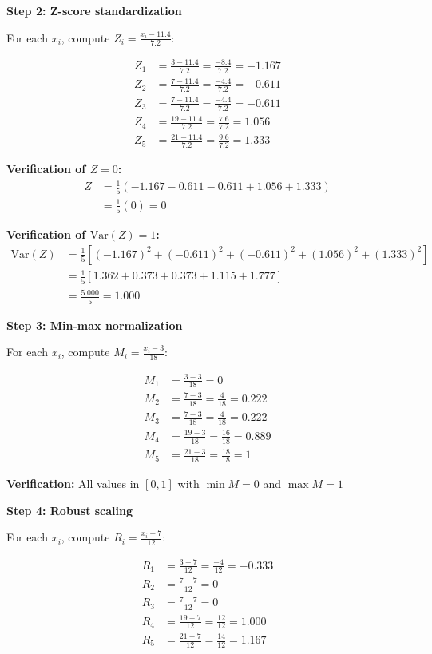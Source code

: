 \documentclass[12pt]{article}
\begin{document}
\begin{solution}
\textbf{Step 2: Z-score standardization}

For each \(x_i\), compute \(Z_i = \frac{x_i - 11.4}{7.2}\):

\begin{align*}
Z_1 &= \frac{3 - 11.4}{7.2} = \frac{-8.4}{7.2} = -1.167 \\
Z_2 &= \frac{7 - 11.4}{7.2} = \frac{-4.4}{7.2} = -0.611 \\
Z_3 &= \frac{7 - 11.4}{7.2} = \frac{-4.4}{7.2} = -0.611 \\
Z_4 &= \frac{19 - 11.4}{7.2} = \frac{7.6}{7.2} = 1.056 \\
Z_5 &= \frac{21 - 11.4}{7.2} = \frac{9.6}{7.2} = 1.333
\end{align*}

\textbf{Verification of \(\bar{Z} = 0\):}
\begin{align*}
\bar{Z} &= \frac{1}{5}(-1.167 - 0.611 - 0.611 + 1.056 + 1.333) \\
&= \frac{1}{5}(0) = 0
\end{align*}

\textbf{Verification of \(\text{Var}(Z) = 1\):}
\begin{align*}
\text{Var}(Z) &= \frac{1}{5}\left[(-1.167)^2 + (-0.611)^2 + (-0.611)^2 + (1.056)^2 + (1.333)^2\right] \\
&= \frac{1}{5}\left[1.362 + 0.373 + 0.373 + 1.115 + 1.777\right] \\
&= \frac{5.000}{5} = 1.000
\end{align*}

\textbf{Step 3: Min-max normalization}

For each \(x_i\), compute \(M_i = \frac{x_i - 3}{18}\):

\begin{align*}
M_1 &= \frac{3 - 3}{18} = 0 \\
M_2 &= \frac{7 - 3}{18} = \frac{4}{18} = 0.222 \\
M_3 &= \frac{7 - 3}{18} = \frac{4}{18} = 0.222 \\
M_4 &= \frac{19 - 3}{18} = \frac{16}{18} = 0.889 \\
M_5 &= \frac{21 - 3}{18} = \frac{18}{18} = 1
\end{align*}

\textbf{Verification:} All values in \([0, 1]\) with \(\min M = 0\) and \(\max M = 1\)

\textbf{Step 4: Robust scaling}

For each \(x_i\), compute \(R_i = \frac{x_i - 7}{12}\):

\begin{align*}
R_1 &= \frac{3 - 7}{12} = \frac{-4}{12} = -0.333 \\
R_2 &= \frac{7 - 7}{12} = 0 \\
R_3 &= \frac{7 - 7}{12} = 0 \\
R_4 &= \frac{19 - 7}{12} = \frac{12}{12} = 1.000 \\
R_5 &= \frac{21 - 7}{12} = \frac{14}{12} = 1.167
\end{align*}


\end{solution}
\end{document}
